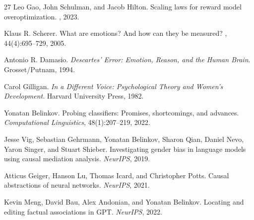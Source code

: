 \documentclass[11pt]{article}
\begin{document}
\begin{thebibliography}{27}
Leo Gao, John Schulman, and Jacob Hilton.
\newblock Scaling laws for reward model overoptimization.
, 2023.

Klaus R. Scherer.
\newblock What are emotions? And how can they be measured?
, 44(4):695--729, 2005.

Antonio R. Damasio.
\newblock \emph{Descartes' Error: Emotion, Reason, and the Human Brain}.
\newblock Grosset/Putnam, 1994.

Carol Gilligan.
\newblock \emph{In a Different Voice: Psychological Theory and Women's Development}.
\newblock Harvard University Press, 1982.

Yonatan Belinkov.
\newblock Probing classifiers: Promises, shortcomings, and advances.
\newblock \emph{Computational Linguistics}, 48(1):207--219, 2022.

Jesse Vig, Sebastian Gehrmann, Yonatan Belinkov, Sharon Qian, Daniel Nevo, Yaron Singer, and Stuart Shieber.
\newblock Investigating gender bias in language models using causal mediation analysis.
\newblock \emph{NeurIPS}, 2019.

Atticus Geiger, Hanson Lu, Thomas Icard, and Christopher Potts.
\newblock Causal abstractions of neural networks.
\newblock \emph{NeurIPS}, 2021.

Kevin Meng, David Bau, Alex Andonian, and Yonatan Belinkov.
\newblock Locating and editing factual associations in {GPT}.
\newblock \emph{NeurIPS}, 2022.

\end{thebibliography}
\end{document}
